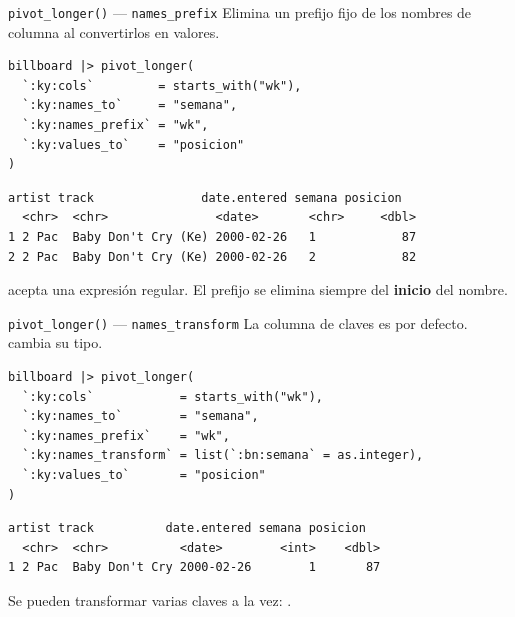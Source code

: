 \documentclass[8pt]{beamer}
\begin{document}
	\begin{frame}[fragile]{\texttt{pivot\_longer()} — \texttt{names\_prefix}}
		Elimina un prefijo fijo de los nombres de columna al convertirlos en valores.

		\begin{lstlisting}[style=RScript]
billboard |> pivot_longer(
  `:ky:cols`         = starts_with("wk"),
  `:ky:names_to`     = "semana",
  `:ky:names_prefix` = "wk",
  `:ky:values_to`    = "posicion"
)
\end{lstlisting}
		\begin{lstlisting}[style=RConsole]
  artist track               date.entered semana posicion
  <chr>  <chr>               <date>       <chr>     <dbl>
1 2 Pac  Baby Don't Cry (Ke) 2000-02-26   1            87
2 2 Pac  Baby Don't Cry (Ke) 2000-02-26   2            82
\end{lstlisting}

		\begin{alertblock}{}
			 acepta una expresión regular. El prefijo se elimina siempre del \textbf{inicio} del nombre.
		\end{alertblock}
	\end{frame}

	\begin{frame}[fragile]{\texttt{pivot\_longer()} — \texttt{names\_transform}}
		La columna de claves es  por defecto.  cambia su tipo.

		\begin{lstlisting}[style=RScript]
billboard |> pivot_longer(
  `:ky:cols`            = starts_with("wk"),
  `:ky:names_to`        = "semana",
  `:ky:names_prefix`    = "wk",
  `:ky:names_transform` = list(`:bn:semana` = as.integer),
  `:ky:values_to`       = "posicion"
)
\end{lstlisting}
		\begin{lstlisting}[style=RConsole]
  artist track          date.entered semana posicion
  <chr>  <chr>          <date>        <int>    <dbl>
1 2 Pac  Baby Don't Cry 2000-02-26        1       87
\end{lstlisting}

		\begin{block}{}
			Se pueden transformar varias claves a la vez: .
		\end{block}
	\end{frame}
\end{document}
